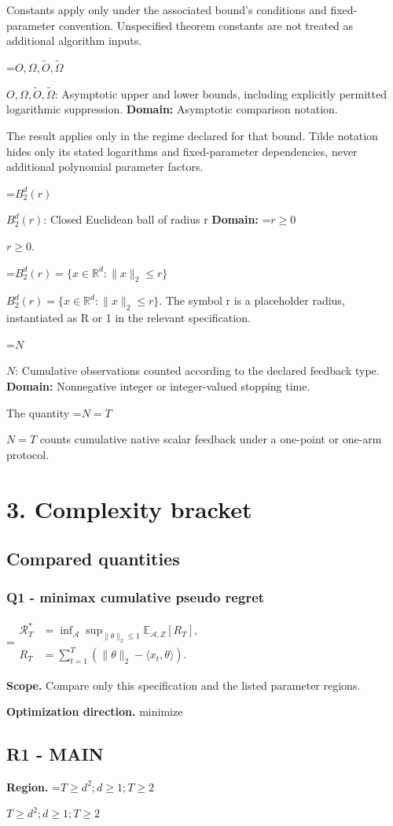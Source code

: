 \documentclass[10pt,a4paper]{article}
\newcommand{\AtlasMath}[1]{\par\begingroup\centering\setbox0=\hbox{$\displaystyle #1$}\ifdim\wd0>1.4\linewidth\typeout{ATLAS WIDE FORMULA: \the\wd0}\fi\ifdim\wd0>\linewidth\resizebox{\linewidth}{!}{\box0}\else\box0\fi\par\endgroup}
\newcommand{\AtlasInlineMath}[1]{\begingroup\setbox0=\hbox{$#1$}\ifdim\wd0>.4\linewidth\endgroup\AtlasMath{#1}\else\endgroup$#1$\fi}
\begin{document}
Constants apply only under the associated bound’s conditions and fixed-parameter convention. Unspecified theorem constants are not treated as additional algorithm inputs.

\AtlasInlineMath{O,\Omega,\widetilde O,\widetilde\Omega}: Asymptotic upper and lower bounds, including explicitly permitted logarithmic suppression. \textbf{Domain:} Asymptotic comparison notation.

The result applies only in the regime declared for that bound. Tilde notation hides only its stated logarithms and fixed-parameter dependencies, never additional polynomial parameter factors.

\AtlasInlineMath{B_2^d(r)}: Closed Euclidean ball of radius r \textbf{Domain:} \AtlasInlineMath{r\ge0}.

\AtlasInlineMath{B_2^d(r)=\{x\in\mathbb R^d:\|x\|_2\le r\}}. The symbol r is a placeholder radius, instantiated as R or 1 in the relevant specification.

\AtlasInlineMath{N}: Cumulative observations counted according to the declared feedback type. \textbf{Domain:} Nonnegative integer or integer-valued stopping time.

The quantity \AtlasInlineMath{N=T} counts cumulative native scalar feedback under a one-point or one-arm protocol.

\section{3. Complexity bracket}
\subsection{Compared quantities}
\subsubsection{Q1 - minimax cumulative pseudo regret}
\AtlasMath{\begin{aligned}\mathcal R_T^*&=\inf_{\mathcal A}\sup_{\|\theta\|_2\le1}\mathbb E_{\mathcal A,Z}[R_T],\\ R_T&=\sum_{t=1}^T(\|\theta\|_2-\langle x_t,\theta\rangle).\end{aligned}}
\textbf{Scope.} Compare only this specification and the listed parameter regions.

\textbf{Optimization direction.} minimize

\subsection{R1 - MAIN}
\textbf{Region.} \AtlasInlineMath{T\ge d^2; d\ge 1; T\ge 2}
\end{document}
